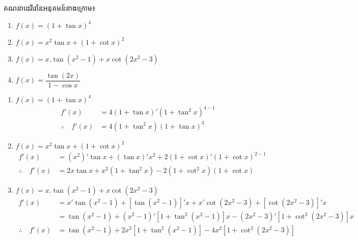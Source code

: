 \documentclass[a4paper,12pt]{article}
\begin{document}
\begin{exercise}
	គណនាដេរីវេនៃអនុគមន៍ខាងក្រោម៖
	\begin{multicols}{2}
		\begin{enumerate}
			\item $f(x)=(1+\tan x)^4$
			\item $f(x)=x^2 \tan x+(1+\cot x)^2$
			\item $f(x)=x.\tan (x^2-1)+x\cot (2x^2 -3)$
			\item $f(x)=\dfrac{\tan (2x)}{1-\cos x}$
		\end{enumerate}
	\end{multicols}
\end{exercise}

\answer
\begin{enumerate}
	\item $f(x)=(1+\tan x)^4$
	      \begin{align*}
		      f'(x)                  & =4(1+\tan x)'(1+\tan^2 x)^{4-1} \\
		      \therefore \quad f'(x) & =4(1+\tan^2 x)(1+\tan x)^3
	      \end{align*}
	\item $f(x)=x^2 \tan x+(1+\cot x)^2$
	      \begin{align*}
		      f'(x)                  & =(x^2)'\tan x+(\tan x)' x^2 +2(1+\cot x)'(1+\cot x)^{2-1} \\
		      \therefore \quad f'(x) & = 2x\tan x+x^2(1+\tan^2 x)-2(1+\cot^2 x)(1+\cot x)
	      \end{align*}

	\item $f(x)=x.\tan (x^2-1)+x\cot (2x^2 -3)$
	      \begin{align*}
		      f'(x)                  & =x'\tan (x^2-1)+[\tan (x^2-1)]'x+x'\cot (2x^2-3)+[\cot (2x^2 -3)]'x     \\
		                             & =\tan (x^2-1)+(x^2-1)'[1+\tan^2 (x^2-1)]x-(2x^2-3)'[1+\cot^2 (2x^2-3)]x \\
		      \therefore \quad f'(x) & =\tan (x^2-1)+2x^2 [1+\tan^2 (x^2-1)]-4x^2[1+\cot^2 (2x^2-3)]
	      \end{align*}
\end{enumerate}
\end{document}
